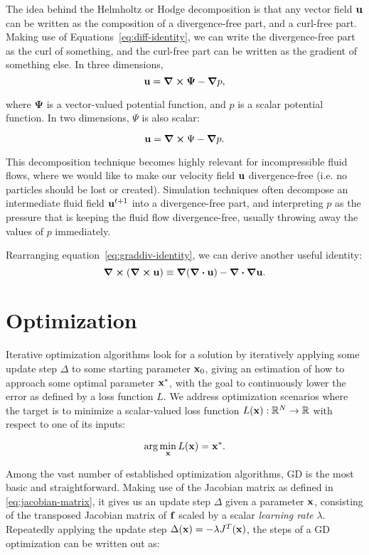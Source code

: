 The idea behind the Helmholtz or Hodge decomposition is that any vector field
$\vb{u}$ can be written as the composition of a divergence-free part, and
a curl-free part. Making use of Equations~\eqref{eq:diff-identity}, we can write
the divergence-free part as the curl of something, and the curl-free part can be
written as the gradient of something else. In three dimensions,
$$\vb{u} = \curl{\boldsymbol\Psi} - \grad{p},$$

where $\boldsymbol\Psi$ is a vector-valued potential function, and $p$ is
a scalar potential function. In two dimensions, $\Psi$ is also scalar:

$$\vb{u} = \curl{\Psi} - \grad{p}.$$

This decomposition technique becomes highly relevant for incompressible fluid
flows, where we would like to make our velocity field $\vb{u}$ divergence-free
(i.e. no particles should be lost or created). Simulation techniques often
decompose an intermediate fluid field $\vb{u}^{t+1}$ into a divergence-free
part, and interpreting $p$ as the pressure that is keeping the fluid flow
divergence-free, usually throwing away the values of $p$ immediately.

Rearranging equation~\eqref{eq:graddiv-identity}, we can derive another useful
identity:
$$\curl(\curl{\vb{u}}) \equiv \grad(\div{\vb{u}}) - \div{\grad{\vb{u}}}.$$

\section{Optimization}\label{section:optimization}
Iterative optimization algorithms look for a solution by iteratively applying
some update step $\Delta$ to some starting parameter $\vb{x}_0$, giving an
estimation of how to approach some optimal parameter $\vb{x}^*$, with the goal
to continuously lower the error as defined by a loss function $L$.  We address
optimization scenarios where the target is to minimize a scalar-valued loss
function $L(\vb{x}): \mathbb{R}^N \to \mathbb{R}$  with respect to one of its
inputs:

$$\label{eq:optimization-target}
\arg\min_{\vb{x}} L(\vb{x}) = \vb{x}^*.$$

Among the vast number of established optimization algorithms, \acf{GD} is the
most basic and straightforward. Making use of the Jacobian matrix as defined in
\eqref{eq:jacobian-matrix}, it gives us an update step $\Delta$ given
a parameter $\vb{x}$, consisting of the transposed Jacobian matrix of $\vb{f}$
scaled by a scalar \textit{learning rate} $\lambda$. Repeatedly applying the
update step $\Delta(\vb{x}) = -\lambda J^T(\vb{x})$, the steps of a \acf{GD}
optimization can be written out as:

